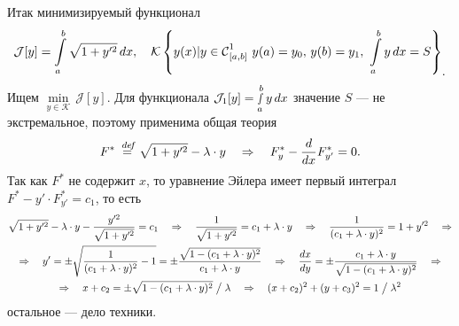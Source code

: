 \documentclass[12pt,a4paper,openany,fleqn]{book}
\newcommand {\defeq}{\stackrel{\hspace{0.09 cm}de\!f}{=}}
\newcommand {\eqdef}{\defeq}
\newcommand{\Cf}{\ensuremath{\mathcal{C}}}
\newcommand{\J}{\ensuremath{\mathcal{J}}}
\newcommand{\mc}[1]{\ensuremath{\mathcal{#1}}}
\newcommand{\Cfn}[2][]{\ensuremath{\Cf{\mathstrut}^{#2}_{#1}}}
\newcommand{\der}[2]{\ensuremath{\frac{d#1}{d#2}}}
\newcommand{\K}{\mc{K}}
\theoremstyle{definition}
\begin{document}
Итак минимизируемый функционал
\begin{equation*}
	\hfill\J[y]=\int\limits_a^b\sqrt{1+y^{\prime2}}\,dx,\quad
	\K\left\{y(x)|y\in\Cfn[{[a,b]}]{1}\ y(a)=y_0,\,y(b)=y_1,\ \int\limits_a^b y\,dx=S\right\}_{\displaystyle.}\hfill
\end{equation*}
Ищем $\min\limits_{y\in\K}\,\J[y]$. Для функционала $\J_1[y]=\smallint\limits_a^b y\,dx$ значение $S$ --- не экстремальное, поэтому применима общая теория
\begin{equation*}
	\hfill F^{\ast}\eqdef\sqrt{1+y^{\prime2}}-\lambda\cdot y\quad\Rightarrow\quad F^{\ast}_{y}-\der{}{x}F^{\ast}_{y'}=0.\hfill
\end{equation*}
Так как $F^{\ast}$ не содержит $x$, то уравнение Эйлера имеет первый интеграл $F^{\ast}-y'\cdot F^{\ast}_{y'}=c_1$, то есть
\begin{gather*}
	\sqrt{1+y^{\prime2}}-\lambda\cdot y-\frac{y^{\prime2}}{\sqrt{1+y^{\prime2}}}=c_1\quad\Rightarrow\quad
	\frac{1}{\sqrt{1+y^{\prime2}}}=c_1+\lambda\cdot y\quad\Rightarrow\quad\frac{1}{(c_1+\lambda\cdot y)^2}=1+y^{\prime2}\quad\Rightarrow\\\Rightarrow\quad y'=\pm\sqrt{\frac{1}{(c_1+\lambda\cdot y)^2}-1}=\pm\frac{\sqrt{1-(c_1+\lambda\cdot y)^2}}{c_1+\lambda\cdot y}\quad\Rightarrow\quad\der{x}{y}=\pm\frac{c_1+\lambda\cdot y}{\sqrt{1-(c_1+\lambda\cdot y)^2}}\quad\Rightarrow\\\Rightarrow\quad x+c_2=\pm\sqrt{1-(c_1+\lambda\cdot y)^2}\bigm/\lambda\quad\Rightarrow\quad (x+c_2)^2+(y+c_3)^2=1\bigm/\lambda^2
\end{gather*}
остальное --- дело техники.
\end{document}
